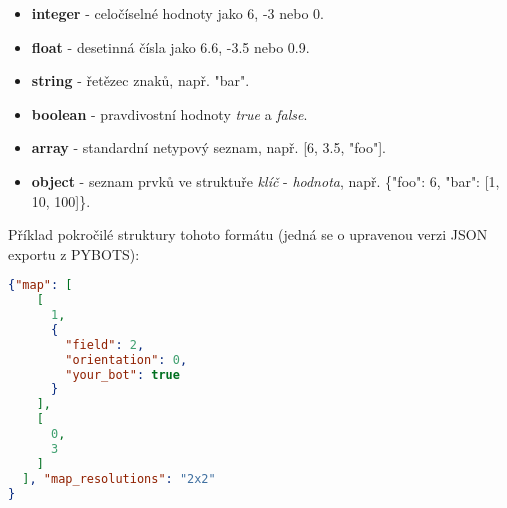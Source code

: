 \documentclass[10pt,titlepage,a4paper]{extarticle}
\begin{document}
\begin{itemize}
    \item
    \textbf{integer} - celočíselné hodnoty jako 6, -3 nebo 0.

    \item
    \textbf{float} - desetinná čísla jako 6.6, -3.5 nebo 0.9.

    \item
    \textbf{string} - řetězec znaků, např. "bar".

    \item
    \textbf{boolean} - pravdivostní hodnoty \textit{true} a \textit{false}.

    \item
    \textbf{array} - standardní netypový seznam, např. [6, 3.5, "foo"].

    \item
    \textbf{object} - seznam prvků ve struktuře \textit{klíč} - \textit{hodnota}, např. \{"foo": 6, "bar": [1, 10, 100]\}.
\end{itemize}

Příklad pokročilé struktury tohoto formátu (jedná se o upravenou verzi JSON exportu z PYBOTS):

\begin{lstlisting}[language=json]
 {"map": [
    [
      1,
      {
        "field": 2,
        "orientation": 0,
        "your_bot": true
      }
    ],
    [
      0,
      3
    ]
  ], "map_resolutions": "2x2"
}
\end{lstlisting}
\end{document}
